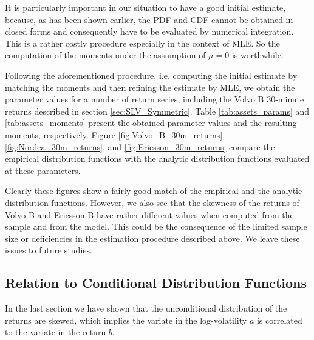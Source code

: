 It is particularly important in our situation to have a good initial
estimate, because, as has been shown earlier, the PDF and CDF cannot
be obtained in closed forms and consequently have to be evaluated by
numerical integration. This is a rather costly procedure especially in
the context of MLE. So the computation of the moments under the
assumption of $\mu = 0$ is worthwhile.

Following the aforementioned procedure, i.e. computing the initial
estimate by matching the moments and then refining the estimate by
MLE, we obtain the parameter values for a number of return series,
including the Volvo B 30-minute returns described in
section \ref{sec:SLV_Symmetric}. Table \ref{tab:assets_params} and
\ref{tab:assets_moments} present the obtained parameter values and the
resulting moments, respectively. Figure \ref{fig:Volvo_B_30m_returns},
\ref{fig:Nordea_30m_returns}, and \ref{fig:Ericsson_30m_returns}
compare the empirical distribution functions with the analytic
distribution functions evaluated at these parameters.

Clearly these figures show a fairly good match of the empirical and
the analytic distribution functions. However, we also see that the
skewness of the returns of Volvo B and Ericsson B have rather
different values when computed from the sample and from the
model. This could be the consequence of the limited sample size or
deficiencies in the estimation procedure described above. We leave
these issues to future studies.


\subsection{Relation to Conditional Distribution Functions}
In the last section we have shown that the unconditional distribution of
the returns are skewed, which implies the variate in the
log-volatility $a$ is correlated to the variate in the return
$b$.

